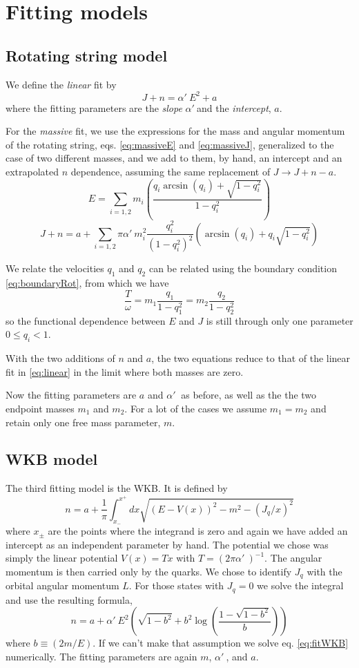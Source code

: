 \documentclass[11pt,a4]{article}
\def\be{\begin{equation}}
\def\ee{\end{equation}}
\newcommand{\alp}{\ensuremath{\alpha'\:}}
\begin{document}
\section{Fitting models}
	\subsection{Rotating string model}
		We define the \emph{linear} fit by
			\be J + n = \alp E^2 + a \label{eq:linear} \ee
		where the fitting parameters are the \emph{slope} \alp and the \emph{intercept}, \(a\).

		For the \emph{massive} fit, we use the expressions for the mass and angular momentum of the rotating string, eqs. \eqref{eq:massiveE} and \eqref{eq:massiveJ}, generalized to the case of two different masses, and we add to them, by hand, an intercept and an extrapolated \(n\) dependence, assuming the same replacement of \(J \rightarrow J + n - a \).
			\be E = \sum_{i = 1,2}m_i\left(\frac{q_i\arcsin(q_i)+\sqrt{1-q_i^2}}{1-q_i^2}\right) \label{eq:massFitE} \ee
			\be J + n = a + \sum_{i=1,2}\pi\alp m_i^2\frac{q_i^2}{(1-q_i^2)^2}\left(\arcsin(q_i)+q_i\sqrt{1-q_i^2}\right) \label{eq:massFitJ} \ee

		We relate the velocities \(q_1\) and \(q_2\) can be related using the boundary condition \eqref{eq:boundaryRot}, from which we have
		\be \frac{T}{\omega} = m_1\frac{q_1}{1-q_1^2} = m_2\frac{q_2}{1-q_2^2} \label{eq:boundaryTwo}\ee
		so the functional dependence between \(E\) and \(J\) is still through only one parameter \(0 \leq q_i < 1\).

		With the two additions of \(n\) and \(a\), the two equations reduce to that of the linear fit in \eqref{eq:linear} in the limit where both masses are zero.

		Now the fitting parameters are \(a\) and \(\alp\) as before, as well as the the two endpoint masses \(m_1\) and \(m_2\). For a lot of the cases we assume \(m_1 = m_2\) and retain only one free mass parameter, \(m\).

\subsection{WKB model}
		The third fitting model is the WKB. It is defined by
		\be n = a + \frac{1}{\pi}\int_{x_-}^{x^+}dx\sqrt{(E-V(x))^2-m^2-(J_q/x)^2} \label{eq:fitWKB} \ee
		where \(x_{\pm}\) are the points where the integrand is zero and again we have added an intercept as an independent parameter by hand.	The potential we chose was simply the linear potential \(V(x) = Tx\) with \(T = (2\pi\alp)^{-1}\). The angular momentum is then carried only by the quarks. We chose to identify \(J_q\) with the orbital angular momentum \(L\). For those states with \(J_q = 0\) we solve the integral and use the resulting formula,
		\be n = a + \alp E^2 \left(\sqrt{1-b^2}+b^2\log\left(\frac{1-\sqrt{1-b^2}}{b}\right)\right) \label{eq:fitWKB0}\ee
		where \(b \equiv (2m/E)\). If we can't make that assumption we solve eq. \eqref{eq:fitWKB} numerically. The fitting parameters are again \(m\), \alp, and \(a\).
\end{document}
